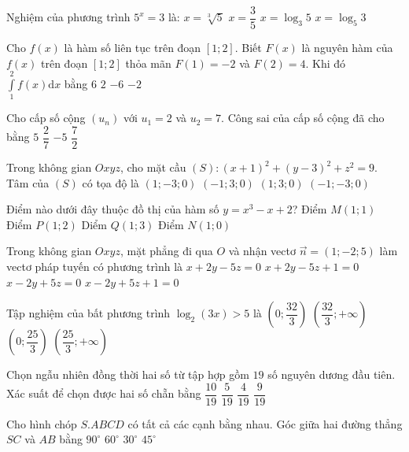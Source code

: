 \begin{ex}%
Nghiệm của phương trình $5^{x}=3$ là:
\choice
{$x=\sqrt[3]{5}$}
{$x=\dfrac{3}{5}$}
{$x=\log_3 5$}
{\True $x=\log_5 3$}

\end{ex}
\begin{ex}%
Cho $f(x)$ là hàm số liên tục trên đoạn $[1; 2]$. Biết $F(x)$ là nguyên hàm của $f(x)$ trên đoạn $[1; 2]$ thỏa mãn $F(1)=-2$ và $F(2)=4$. Khi đó $\displaystyle\int\limits_1^2 f(x) \mathrm{d} x$ bằng
\choice
{\True $6$}
{$2$}
{$-6$}
{$-2$}

\end{ex}
\begin{ex}%
Cho cấp số cộng $\left(u_n\right)$ với $u_1=2$ và $u_2=7$. Công sai của cấp số cộng đã cho bằng
\choice
{\True $5$}
{$\dfrac{2}{7}$}
{$-5$}
{$\dfrac{7}{2}$}

\end{ex}
\begin{ex}%
Trong không gian $O x y z$, cho mặt cầu $(S)\colon(x+1)^2+(y-3)^2+z^2=9$. Tâm của $(S)$ có tọa độ là
\choice
{$(1;-3; 0)$}
{\True $(-1; 3; 0)$}
{$(1; 3; 0)$}
{$(-1;-3; 0)$}

\end{ex}
\begin{ex}%
Điểm nào dưới đây thuộc đồ thị của hàm số $y=x^3-x+2$?
\choice
{Điểm $M(1; 1)$}
{\True Điểm $P(1; 2)$}
{Diểm $Q(1; 3)$}
{Điểm $N(1; 0)$}

\end{ex}
\begin{ex}%
Trong không gian $O x y z$, mặt phẳng đi qua $O$ và nhận vectơ $\vec{n}=(1;-2; 5)$ làm vectơ pháp tuyến có phương trình là
\choice
{$x+2 y-5 z=0$}
{$x+2 y-5 z+1=0$}
{\True $x-2 y+5 z=0$}
{$x-2 y+5 z+1=0$}

\end{ex}
\begin{ex}%
Tập nghiệm của bất phương trình $\log_2(3 x)>5$ là
\choice
{$\left(0; \dfrac{32}{3}\right)$}
{\True $\left(\dfrac{32}{3};+\infty\right)$}
{$\left(0; \dfrac{25}{3}\right)$}
{$\left(\dfrac{25}{3};+\infty\right)$}

\end{ex}
\begin{ex}%
Chọn ngẫu nhiên đồng thời hai số từ tập hợp gồm $19$ số nguyên dương đầu tiên. Xác suất để chọn được hai số chẵn bằng
\choice
{$\dfrac{10}{19}$}
{$\dfrac{5}{19}$}
{\True $\dfrac{4}{19}$}
{$\dfrac{9}{19}$}

\end{ex}
\begin{ex}%
Cho hình chóp $S.ABCD$ có tất cả các cạnh bằng nhau. Góc giữa hai đường thẳng $SC$ và $AB$ bằng
\choice
{$90^{\circ}$}
{\True $60^{\circ}$}
{$30^{\circ}$}
{$45^{\circ}$}

\end{ex}

